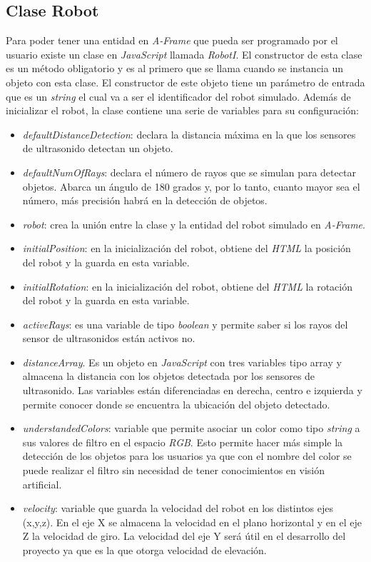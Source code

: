 \subsection{Clase Robot}
\label{subsec:robot}
Para poder tener una entidad en \textit{A-Frame} que pueda ser programado por el usuario existe un clase en \textit{JavaScript} llamada \textit{RobotI}.
El constructor de esta clase es un método obligatorio y es al primero que se llama cuando se instancia un objeto con esta clase. 
El constructor de este objeto tiene un parámetro de entrada que es un \textit{string} el cual va a ser el identificador del robot simulado. 
Además de inicializar el robot, la clase contiene una serie de variables para su configuración: 
\begin{itemize}
    \item \textit{defaultDistanceDetection}: declara la distancia máxima en la que los sensores de ultrasonido detectan un objeto.
    \item \textit{defaultNumOfRays}: declara el número de rayos que se simulan para detectar objetos. Abarca un ángulo de 180 grados y, por lo tanto, cuanto mayor sea el número, más precisión habrá en la detección de objetos. 
    \item \textit{robot}: crea la unión entre la clase y la entidad del robot simulado en \textit{A-Frame}.
    \item \textit{initialPosition}: en la inicialización del robot, obtiene del \textit{HTML} la posición del robot y la guarda en esta variable.  
    \item \textit{initialRotation}: en la inicialización del robot, obtiene del \textit{HTML} la rotación del robot y la guarda en esta variable.  
    \item \textit{activeRays}: es una variable de tipo \textit{boolean} y permite saber si los rayos del sensor de ultrasonidos están activos no.
    \item \textit{distanceArray}. Es un objeto en \textit{JavaScript} con tres variables tipo array y almacena la distancia con los objetos detectada por los sensores de ultrasonido. Las variables están diferenciadas en derecha, centro e izquierda y permite conocer donde se encuentra la ubicación del objeto detectado. 
    \item \textit{understandedColors}: variable que permite asociar un color como tipo \textit{string} a sus valores de filtro en el espacio \textit{RGB}. Esto permite hacer más simple la detección de los objetos para los usuarios ya que con el nombre del color se puede realizar el filtro sin necesidad de tener conocimientos en visión artificial. 
    \item \textit{velocity}: variable que guarda la velocidad del robot en los distintos ejes (x,y,z). En el eje X se almacena la velocidad en el plano horizontal y en el eje Z la velocidad de giro. La velocidad del eje Y será útil en el desarrollo del proyecto ya que es la que otorga velocidad de elevación. 
\end{itemize}

